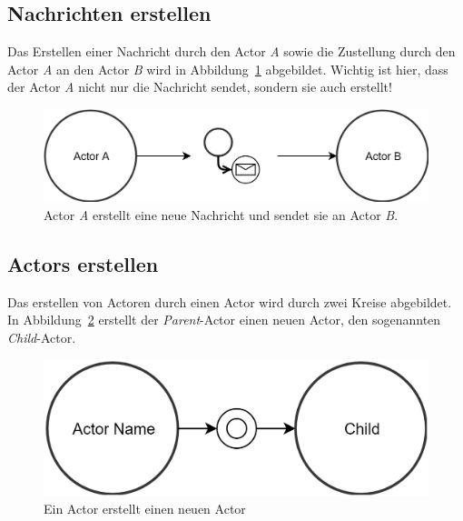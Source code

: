 \subsection{Nachrichten erstellen}
Das Erstellen einer Nachricht durch den Actor \textit{A} sowie die Zustellung durch den Actor \textit{A} an den Actor \textit{B} wird in Abbildung~\ref{fig:actor:diagram:simpleCreateAndSendMessage} abgebildet. Wichtig ist hier, dass der Actor \textit{A} nicht nur die Nachricht sendet, sondern sie auch erstellt!
\begin{figure}
    \centering
    \includegraphics[width=\linewidth]{gfx/actor/simpleCreateAndSendMessage}
    \caption{Actor \textit{A} erstellt eine neue Nachricht und sendet sie an Actor \textit{B}.}
    \label{fig:actor:diagram:simpleCreateAndSendMessage}
\end{figure}

\subsection{Actors erstellen}
Das erstellen von Actoren durch einen Actor wird durch zwei Kreise abgebildet. In Abbildung~\ref{fig:actor:diagram:childActorCreation} erstellt der \textit{Parent}-Actor einen neuen Actor, den sogenannten \textit{Child}-Actor.
\begin{figure}
    \centering
    \includegraphics[width=.7\linewidth]{gfx/actor/childActorCreation}
    \caption{Ein Actor erstellt einen neuen Actor}
    \label{fig:actor:diagram:childActorCreation}
\end{figure}


